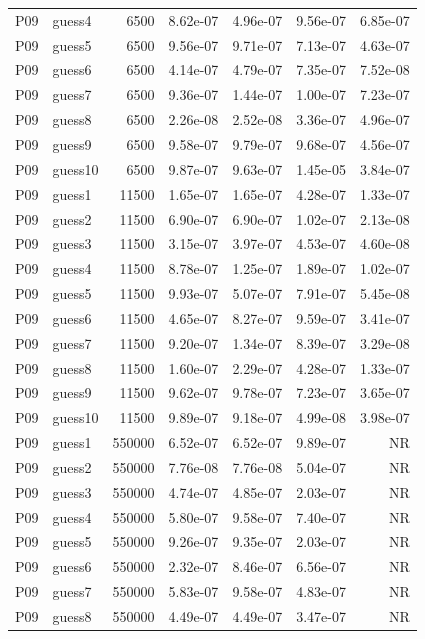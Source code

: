 {\begin{longtable}{llrrrrr}
P09 & guess4 & 6500 & 8.62e-07 & 4.96e-07 & 9.56e-07 & 6.85e-07 \\
P09 & guess5 & 6500 & 9.56e-07 & 9.71e-07 & 7.13e-07 & 4.63e-07 \\
P09 & guess6 & 6500 & 4.14e-07 & 4.79e-07 & 7.35e-07 & 7.52e-08 \\
P09 & guess7 & 6500 & 9.36e-07 & 1.44e-07 & 1.00e-07 & 7.23e-07 \\
P09 & guess8 & 6500 & 2.26e-08 & 2.52e-08 & 3.36e-07 & 4.96e-07 \\
P09 & guess9 & 6500 & 9.58e-07 & 9.79e-07 & 9.68e-07 & 4.56e-07 \\
P09 & guess10 & 6500 & 9.87e-07 & 9.63e-07 & 1.45e-05 & 3.84e-07 \\
P09 & guess1 & 11500 & 1.65e-07 & 1.65e-07 & 4.28e-07 & 1.33e-07 \\
P09 & guess2 & 11500 & 6.90e-07 & 6.90e-07 & 1.02e-07 & 2.13e-08 \\
P09 & guess3 & 11500 & 3.15e-07 & 3.97e-07 & 4.53e-07 & 4.60e-08 \\
P09 & guess4 & 11500 & 8.78e-07 & 1.25e-07 & 1.89e-07 & 1.02e-07 \\
P09 & guess5 & 11500 & 9.93e-07 & 5.07e-07 & 7.91e-07 & 5.45e-08 \\
P09 & guess6 & 11500 & 4.65e-07 & 8.27e-07 & 9.59e-07 & 3.41e-07 \\
P09 & guess7 & 11500 & 9.20e-07 & 1.34e-07 & 8.39e-07 & 3.29e-08 \\
P09 & guess8 & 11500 & 1.60e-07 & 2.29e-07 & 4.28e-07 & 1.33e-07 \\
P09 & guess9 & 11500 & 9.62e-07 & 9.78e-07 & 7.23e-07 & 3.65e-07 \\
P09 & guess10 & 11500 & 9.89e-07 & 9.18e-07 & 4.99e-08 & 3.98e-07 \\
P09 & guess1 & 550000 & 6.52e-07 & 6.52e-07 & 9.89e-07 & NR \\
P09 & guess2 & 550000 & 7.76e-08 & 7.76e-08 & 5.04e-07 & NR \\
P09 & guess3 & 550000 & 4.74e-07 & 4.85e-07 & 2.03e-07 & NR \\
P09 & guess4 & 550000 & 5.80e-07 & 9.58e-07 & 7.40e-07 & NR \\
P09 & guess5 & 550000 & 9.26e-07 & 9.35e-07 & 2.03e-07 & NR \\
P09 & guess6 & 550000 & 2.32e-07 & 8.46e-07 & 6.56e-07 & NR \\
P09 & guess7 & 550000 & 5.83e-07 & 9.58e-07 & 4.83e-07 & NR \\
P09 & guess8 & 550000 & 4.49e-07 & 4.49e-07 & 3.47e-07 & NR \\

\end{longtable}}
